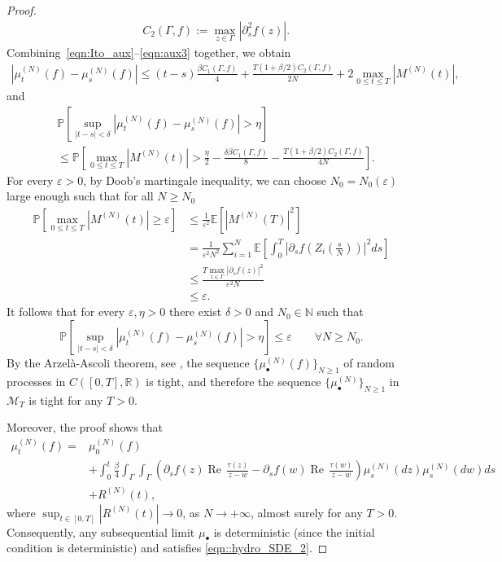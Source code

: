 \documentclass[11pt]{article}
\renewcommand{\Re}{\operatorname{Re}\,}
\numberwithin{equation}{section}
\theoremstyle{definition}
\begin{document}
\begin{proof}
\begin{align*}
    &C_{2}(\Gamma, f) := \max_{z\in\Gamma}|\partial_{s}^{2}f(z)|. 
\end{align*}
Combining~\eqref{eqn:Ito_aux}--\eqref{eqn:aux3} together, we obtain 
\begin{align*}
    |\mu^{(N)}_{t}(f)-\mu^{(N)}_{s}(f)| 
    \le (t-s)\frac{\beta C_{1}(\Gamma,f)}{4}+   \frac{T(1+\beta/2)C_{2}(\Gamma,f)}{2N} + 2\max_{0\le t\le T}|M^{(N)}(t)|,
\end{align*}
and
\[
\begin{split}
    &\mathbb{P}\left[\sup_{|t-s|<\delta}|\mu^{(N)}_{t}(f)-\mu^{(N)}_{s}(f)| >\eta\right]\\
    &\le \mathbb{P}\left[\max_{0\le t\le T}|M^{(N)}(t)| >\frac{\eta}{2}-\frac{\delta\beta C_{1}(\Gamma, f)}{8}- \frac{T(1+\beta/2)C_{2}(\Gamma,f)}{4N}\right].
\end{split}
\]
For every $\varepsilon>0$, by Doob's martingale inequality, we can choose $N_{0}=N_{0}(\varepsilon)$ large enough such that for all $N\ge N_{0}$ 
\begin{align}\label{eqn:aux1}
    \mathbb P\left[\max_{0\le t\le T}\left|M^{(N)}(t)\right|\ge \varepsilon\right]
    &\le \frac{1}{\varepsilon^2}\mathbb E\left[\left|M^{(N)}(T)\right|^2\right]\\
    &= \frac{1}{\varepsilon^2 N^{2}} \sum_{i=1}^{N}\mathbb{E}\left[\int_{0}^{T}|\partial_{s}f(Z_{i}(\tfrac{s}{N}))|^{2}ds\right]\\
    &\le \frac{T \max_{z\in\Gamma}|\partial_{s}f(z)|^{2}}{\varepsilon^2 N}\\
    &\le \varepsilon.
\end{align}
It follows that for every $\varepsilon,\eta>0$ there exist $\delta>0$ and $N_{0}\in\mathbb{N}$ such that 
\[
    \mathbb{P}\left[\sup_{|t-s|<\delta}|\mu^{(N)}_{t}(f)-\mu^{(N)}_{s}(f)| >\eta\right]
    \le\varepsilon\qquad \forall N\ge N_{0}.
\]
By the Arzelà-Ascoli theorem, see \cite[Theorem 7.3]{billingsley2013convergence}, the sequence $\{\mu_{\bullet}^{(N)}(f)\}_{N\ge 1}$ of random processes in $C([0,T],\mathbb{R})$ is tight, and therefore the sequence $\{\mu_{\bullet}^{(N)}\}_{N\ge 1}$ in $\mathcal{M}_{T}$ is tight for any $T>0$.

Moreover, the proof shows that 
\[
\begin{split}
    \mu_{t}^{(N)}(f)
    =&\mu_{0}^{(N)}(f)\\
    &+\int_{0}^{t}\frac{\beta}{4}\int_\Gamma\int_\Gamma\left(\partial_s f(z)\Re\frac{\tau(z)}{z-w}-\partial_s f(w)\Re\frac{\tau(w)}{z-w}\right)\mu^{(N)}_s(dz)\mu^{(N)}_s(dw)ds \\
    &+ R^{(N)}(t),
\end{split}
\]
where $\sup_{t\in[0,T]}|R^{(N)}(t)|\to0$, as $N\to+\infty$, almost surely for any $T>0$. Consequently, any subsequential limit $\mu_{\bullet}$ is deterministic (since the initial condition is deterministic) and  satisfies \eqref{eqn::hydro_SDE_2}.
\end{proof}
\end{document}
